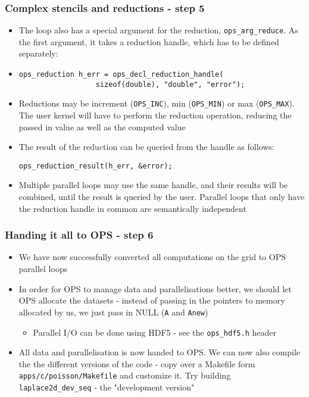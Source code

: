 \documentclass{beamer}
\begin{document}
\begin{frame}[fragile]
\frametitle{Complex stencils and reductions - step 5}
\begin{itemize}
\item The loop also has a special argument for the reduction, \texttt{ops\_arg\_reduce}. As the first argument, it takes a reduction handle, which has to be defined separately:
\item \begin{lstlisting}
ops_reduction h_err = ops_decl_reduction_handle(
                  sizeof(double), "double", "error");\end{lstlisting}  
  \item Reductions may be increment (\texttt{OPS\_INC}), min (\texttt{OPS\_MIN}) or max (\texttt{OPS\_MAX}). The user kernel will have to perform the reduction operation, reducing the passed in value as well as the computed value
  \item The result of the reduction can be queried from the handle as follows:
\begin{lstlisting}
ops_reduction_result(h_err, &error);
\end{lstlisting}  
\item Multiple parallel loops may use the same handle, and their results will be combined, until the result is queried by the user. Parallel loops that only have the reduction handle in common are semantically independent
\end{itemize}
\end{frame}

\begin{frame}[fragile]
\frametitle{Handing it all to OPS - step 6}
\begin{itemize}
\item We have now successfully converted all computations on the grid to OPS parallel loops
\item In order for OPS to manage data and parallelisations better, we should let OPS allocate the datasets - instead of passing in the pointers to memory allocated by us, we just pass in NULL (\texttt{A} and \texttt{Anew})
\begin{itemize}
\item Parallel I/O can be done using HDF5 - see the \texttt{ops\_hdf5.h} header
\end{itemize}
\item All data and parallelisation is now handed to OPS. We can now also compile the the different versions of the code - copy over a Makefile form \texttt{apps/c/poisson/Makefile} and customize it. Try building \texttt{laplace2d\_dev\_seq} - the "development version"
\end{itemize}
\end{frame}
\end{document}

